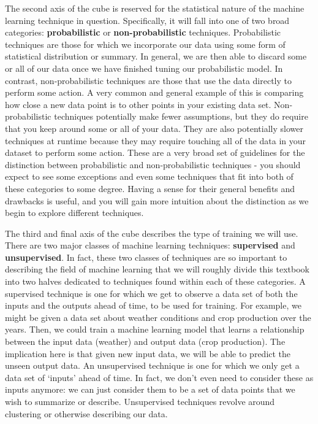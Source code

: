 The second axis of the cube is reserved for the statistical nature of the machine learning technique in question. Specifically, it will fall into one of two broad categories: \textbf{probabilistic} or \textbf{non-probabilistic} techniques. Probabilistic techniques are those for which we incorporate our data using some form of statistical distribution or summary. In general, we are then able to discard some or all of our data once we have finished tuning our probabilistic model. In contrast, non-probabilistic techniques are those that use the data directly to perform some action. A very common and general example of this is comparing how close a new data point is to other points in your existing data set. Non-probabilistic techniques potentially make fewer assumptions, but they do require that you keep around some or all of your data. They are also potentially slower techniques at runtime because they may require touching all of the data in your dataset to perform some action. These are a very broad set of guidelines for the distinction between probabilistic and non-probabilistic techniques - you should expect to see some exceptions and even some techniques that fit into both of these categories to some degree. Having a sense for their general benefits and drawbacks is useful, and you will gain more intuition about the distinction as we begin to explore different techniques.

The third and final axis of the cube describes the type of training we will use. There are two major classes of machine learning techniques: \textbf{supervised} and \textbf{unsupervised}. In fact, these two classes of techniques are so important to describing the field of machine learning that we will roughly divide this textbook into two halves dedicated to techniques found within each of these categories. A supervised technique is one for which we get to observe a data set of both the inputs and the outputs ahead of time, to be used for training. For example, we might be given a data set about weather conditions and crop production over the years. Then, we could train a machine learning model that learns a relationship between the input data (weather) and output data (crop production). The implication here is that given new input data, we will be able to predict the unseen output data. An unsupervised technique is one for which we only get a data set of `inputs' ahead of time. In fact, we don't even need to consider these as inputs anymore: we can just consider them to be a set of data points that we wish to summarize or describe. Unsupervised techniques revolve around clustering or otherwise describing our data.

